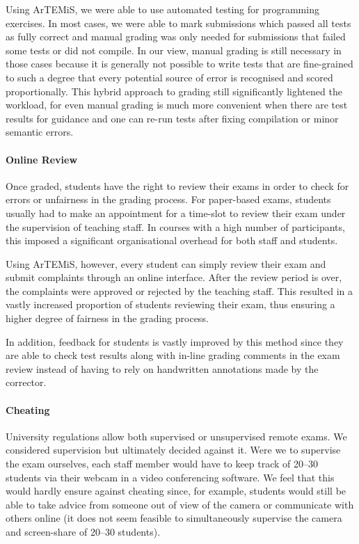Using ArTEMiS, we were able to use automated testing for programming exercises.
In most cases, we were able to mark submissions which passed all tests as fully correct
and manual grading was only needed for submissions that failed some tests or did not compile.
In our view, manual grading is still necessary in those cases because it is generally not possible to write tests that are fine-grained to such a degree that every potential source of error is recognised and scored proportionally.
This hybrid approach to grading still significantly lightened the workload, for even manual grading is much more convenient when there are test results for guidance and one can re-run tests after fixing compilation or minor semantic errors.

\paragraph{Online Review}

Once graded, students have the right to review their
exams in order to check for errors or unfairness in the grading process.
For paper-based exams, students usually had to make an
appointment for a time-slot to review their exam under
the supervision of teaching staff.
In courses with a high number of participants, this imposed a significant organisational overhead for both staff and students.

Using ArTEMiS, however, every student can simply review their exam and submit complaints through an online interface.
After the review period is over,
the complaints were approved or rejected by the teaching staff.
This resulted in a vastly increased proportion of students reviewing their exam,
thus ensuring a higher degree of fairness in the grading process.

In addition, feedback for students is vastly improved by this method since they are able to check test results along with in-line grading comments in the exam review instead of having to rely on handwritten annotations made by the corrector.

\paragraph{Cheating}

University regulations allow both supervised or unsupervised remote exams.
We considered supervision but ultimately decided against it. Were we to supervise the exam ourselves,
each staff member would have to keep track of 20--30 students via their webcam in a video conferencing software.
We feel that this would hardly ensure against cheating
since, for example, students would still be able to take advice from someone out of view of the camera or communicate with others online (it does not seem feasible to simultaneously supervise the camera and screen-share of 20--30 students).

